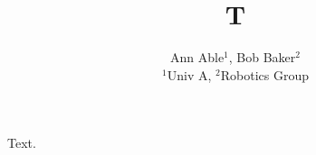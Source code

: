 \documentclass{article}
\begin{document}
\title{T}
\author{Ann Able$^1$, Bob Baker$^2$\\ $^1$Univ A, $^2$Robotics Group}
\maketitle
Text.
\end{document}
